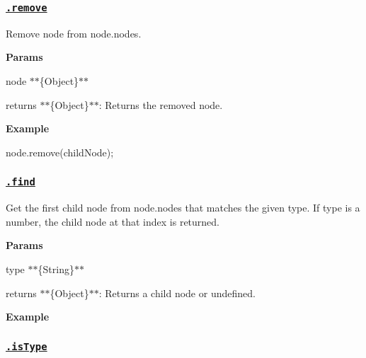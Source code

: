 \subsubsection*{\href{index.js#L205}{\tt .remove}}

Remove {\ttfamily node} from {\ttfamily node.\+nodes}.

{\bfseries Params}


\begin{DoxyItemize}
\item {\ttfamily node} $\ast$$\ast$\{Object\}$\ast$$\ast$
\item {\ttfamily returns} $\ast$$\ast$\{Object\}$\ast$$\ast$\+: Returns the removed node.
\end{DoxyItemize}

{\bfseries Example}


\begin{DoxyCode}
node.remove(childNode);
\end{DoxyCode}


\subsubsection*{\href{index.js#L231}{\tt .find}}

Get the first child node from {\ttfamily node.\+nodes} that matches the given {\ttfamily type}. If {\ttfamily type} is a number, the child node at that index is returned.

{\bfseries Params}


\begin{DoxyItemize}
\item {\ttfamily type} $\ast$$\ast$\{String\}$\ast$$\ast$
\item {\ttfamily returns} $\ast$$\ast$\{Object\}$\ast$$\ast$\+: Returns a child node or undefined.
\end{DoxyItemize}

{\bfseries Example}




\subsubsection*{\href{index.js#L249}{\tt .is\+Type}}

